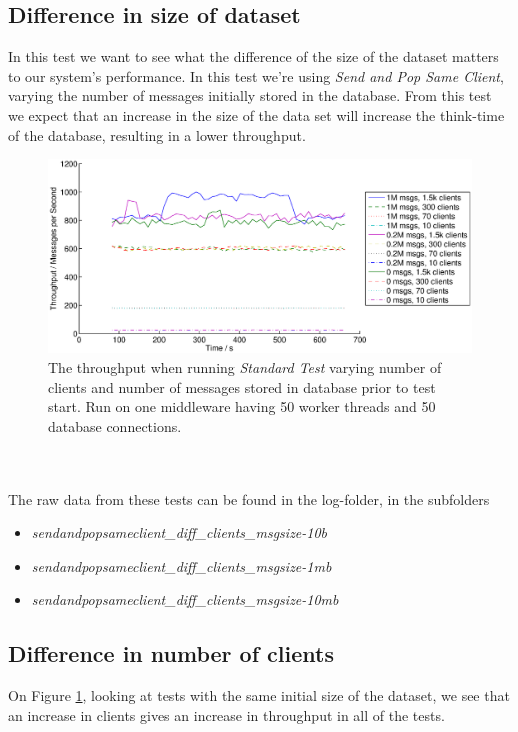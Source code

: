 \documentclass{article}
\begin{document}
        \subsection{Difference in size of dataset}
            In this test we want to see what the difference of the size of the dataset matters to our system's performance. In this test we're using \textit{Send and Pop Same Client}, varying the number of messages initially stored in the database. From this test we expect that an increase in the size of the data set will increase the think-time of the database, resulting in a lower throughput.
            \begin{figure}[H]
                \hspace{-1.5cm}
                \includegraphics[scale=0.55]{msg_db_clients}
                \caption{The throughput when running \textit{Standard Test} varying number of clients and number of messages stored in database prior to test start. Run on one middleware having 50 worker threads and 50 database connections.}
                \label{fig:msg_db_clients}
            \end{figure}
            ~\\
            \\
            The raw data from these tests can be found in the log-folder, in the subfolders
            \begin{itemize}
                \item \textit{sendandpopsameclient\_diff\_clients\_msgsize-10b}
                \item \textit{sendandpopsameclient\_diff\_clients\_msgsize-1mb}
                \item \textit{sendandpopsameclient\_diff\_clients\_msgsize-10mb}
            \end{itemize}

        \subsection{Difference in number of clients}
            On Figure \ref{fig:msg_db_clients}, looking at tests with the same initial size of the dataset, we see that an increase in clients gives an increase in throughput in all of the tests. 
\end{document}
